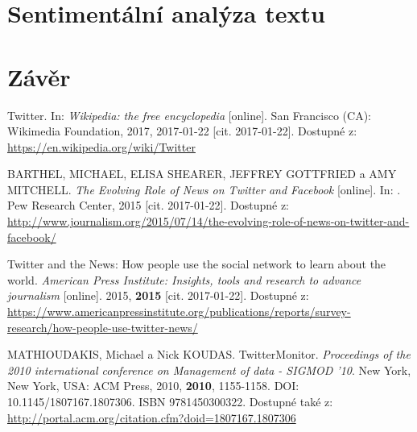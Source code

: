 \documentclass[12pt, a4paper]{article}
\numberwithin{equation}{section} 	%
\begin{document}
\section{Sentimentální analýza textu}
\noindent 


\newpage
\section{Závěr}
\noindent

\newpage
\begin{thebibliography}{99}

    Twitter. In: \textit{Wikipedia: the free encyclopedia} [online]. San Francisco (CA): Wikimedia Foundation, 2017, 2017-01-22 [cit. 2017-01-22]. Dostupné z: \url{https://en.wikipedia.org/wiki/Twitter}

    BARTHEL, MICHAEL, ELISA SHEARER, JEFFREY GOTTFRIED a AMY MITCHELL. \textit{The Evolving Role of News on Twitter and Facebook} [online]. In: . Pew Research Center, 2015 [cit. 2017-01-22]. Dostupné z: \url{http://www.journalism.org/2015/07/14/the-evolving-role-of-news-on-twitter-and-facebook/}

    Twitter and the News: How people use the social network to learn about the world. \textit{American Press Institute: Insights, tools and research to advance journalism} [online]. 2015, \textbf{2015} [cit. 2017-01-22]. Dostupné z: \url{https://www.americanpressinstitute.org/publications/reports/survey-research/how-people-use-twitter-news/}

    MATHIOUDAKIS, Michael a Nick KOUDAS. TwitterMonitor. \textit{Proceedings of the 2010 international conference on Management of data - SIGMOD '10}. New York, New York, USA: ACM Press, 2010, \textbf{2010}, 1155-1158. DOI: 10.1145/1807167.1807306. ISBN 9781450300322. Dostupné také z: \url{http://portal.acm.org/citation.cfm?doid=1807167.1807306}


\end{thebibliography}
\end{document}
